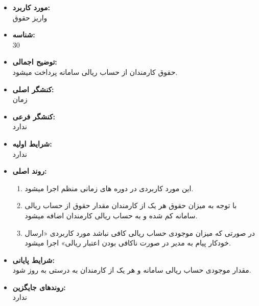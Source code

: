 \documentclass{article}
\begin{document}
\begin{itemize}
\item \textbf{مورد کاربرد:}\\
واریز حقوق
\item \textbf{شناسه:}\\
30
\item \textbf{توضیح اجمالی:}\\
حقوق کارمندان از حساب ریالی سامانه پرداخت میشود.
\item \textbf{کنشگر اصلی:}\\
زمان
\item \textbf{کنشگر فرعی:}\\
ندارد
\item \textbf{شرایط اولیه:}\\
ندارد
\item \textbf{روند اصلی:}\\
\begin{enumerate}
\item  این مورد کاربردی در دوره های زمانی منظم اجرا میشود.
\item با توجه به میزان حقوق هر یک از کارمندان مقدار حقوق از حساب ریالی سامانه کم شده و به حساب ریالی کارمندان اضافه میشود.
\item در صورتی که میزان موجودی حساب ریالی کافی نباشد مورد کاربردی «ارسال خودکار پیام به مدیر در صورت ناکافی بودن اعتبار ریالی» اجرا میشود.
\end{enumerate}
\item \textbf{شرایط پایانی:}\\ 
مقدار موجودی حساب ریالی سامانه و هر یک از کارمندان به درستی به روز شود.
\item \textbf{روندهای جایگزین:}\\
ندارد
\end{itemize}
\noindent\makebox[\linewidth]{\rule{\paperwidth}{0.4pt}}
\end{document}
